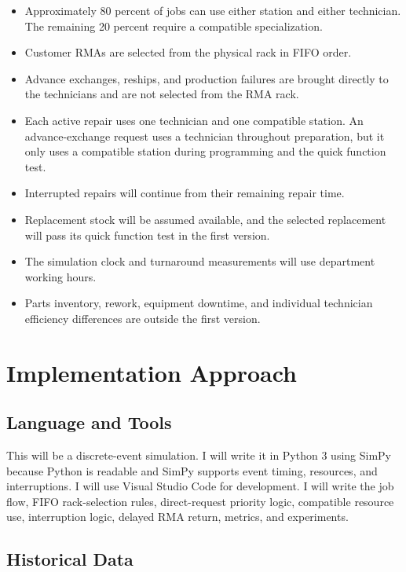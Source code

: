 \documentclass[12pt, letterpaper, twoside]{article}
\begin{document}
\begin{itemize}
    \item Approximately 80 percent of jobs can use either station and either technician.
    The remaining 20 percent require a compatible specialization.
    \item Customer RMAs are selected from the physical rack in FIFO order.
    \item Advance exchanges, reships, and production failures are brought directly to the
    technicians and are not selected from the RMA rack.
    \item Each active repair uses one technician and one compatible station. An
    advance-exchange request uses a technician throughout preparation, but it only uses a
    compatible station during programming and the quick function test.
    \item Interrupted repairs will continue from their remaining repair time.
    \item Replacement stock will be assumed available, and the selected replacement will
    pass its quick function test in the first version.
    \item The simulation clock and turnaround measurements will use department working hours.
    \item Parts inventory, rework, equipment downtime, and individual technician efficiency
    differences are outside the first version.
\end{itemize}

\section{Implementation Approach}
\label{sec:implementation}

\subsection{Language and Tools}

This will be a discrete-event simulation. I will write it in Python 3 using
SimPy because Python is readable and SimPy supports event timing, resources, and
interruptions. I will use Visual Studio Code for development. I will
write the job flow, FIFO rack-selection rules, direct-request priority logic, compatible
resource use, interruption logic, delayed RMA return, metrics, and experiments. 

\subsection{Historical Data}
\end{document}
